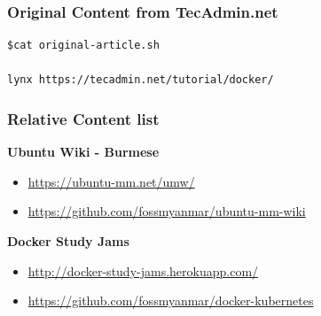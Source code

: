 \documentclass{article}
\begin{document}
\subsubsection{Original Content from
TecAdmin.net}\label{original-content-from-tecadmin.net}

\begin{verbatim}
$cat original-article.sh

lynx https://tecadmin.net/tutorial/docker/
\end{verbatim}



\subsubsection{}\label{section}

\subsubsection{Relative Content list}\label{relative-content-list}

\textbf{Ubuntu Wiki - Burmese}

\begin{itemize}
\itemsep1pt\parskip0pt
\item
  \href{https://ubuntu-mm.net/umw/}{\url{https://ubuntu-mm.net/umw/}}\\
\item
  \href{https://github.com/fossmyanmar/ubuntu-mm-wiki}{\url{https://github.com/fossmyanmar/ubuntu-mm-wiki}}
\end{itemize}

\textbf{Docker Study Jams}

\begin{itemize}
\itemsep1pt\parskip0pt
\item
  \href{http://docker-study-jams.herokuapp.com/}{\url{http://docker-study-jams.herokuapp.com/}}\\
\item
  \href{https://github.com/fossmyanmar/docker-kubernetes}{\url{https://github.com/fossmyanmar/docker-kubernetes}}
\end{itemize}
\end{document}
